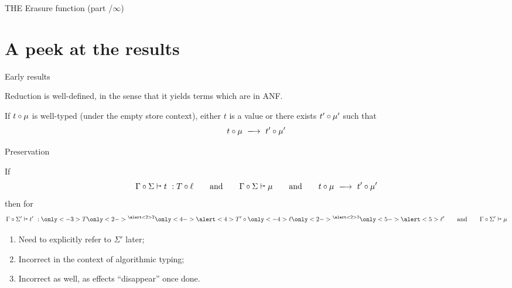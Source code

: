 \documentclass[aspectratio=169]{beamer}
\newcommand{\sectionimg}[0]{}
\renewcommand{\sectionimg}[0]{}
\let\sectionbase\section
\renewcommand{\section}[2][]{\renewcommand{\sectionimg}{#1}\sectionbase{#2}}
\begin{document}
\begin{frame}{THE Erasure function (part \insertslidenumber/$\infty$)}
\end{frame}

\section{A peek at the results}

\begin{frame}{Early results}
    \begin{theorem}
        Reduction is well-defined, in the sense that it yields terms which are in ANF.
    \end{theorem}

    \begin{theorem}[Progress]
        If ${t \circ \mu}$ is well-typed (under the empty store context), either $t$ is a value or there exists ${t' \circ \mu'}$ such that 
        \[ \reduces{t}{\mu}{t'}{\mu'} \]
    \end{theorem}
\end{frame}

\begin{frame}{Preservation}
    \begin{theorem}[Preservation]
        If
        \[\ajudgment{\Gamma}{\Sigma}{t}{T}{\ell} \qquad\text{and}\qquad \asjudgment{\Gamma}{\Sigma}{\mu} \qquad\text{and}\qquad \reduces{t}{\mu}{t'}{\mu'} \]
        then for 
        \[\ajudgment{\Gamma}{\Sigma'}{t'}{
                \only<-3>{T\only<2->{\textsuperscript{\alert<2>{2}}}}
                \only<4->{\alert<4>{T'}}
            }{
                \only<-4>{\ell\only<2->{\textsuperscript{\alert<2>{3}}}}
                \only<5->{\alert<5>{\ell'}}
            } \qquad\text{and}\qquad \asjudgment{\Gamma}{\Sigma'}{\mu} \]
    \end{theorem}
    \begin{enumerate}
        \item<2> Need to explicitly refer to $\Sigma'$ later;
        \item<2-3> Incorrect in the context of algorithmic typing;
        \item<2-4> Incorrect as well, as effects ``disappear'' once done.
    \end{enumerate}
\end{frame}
\end{document}
